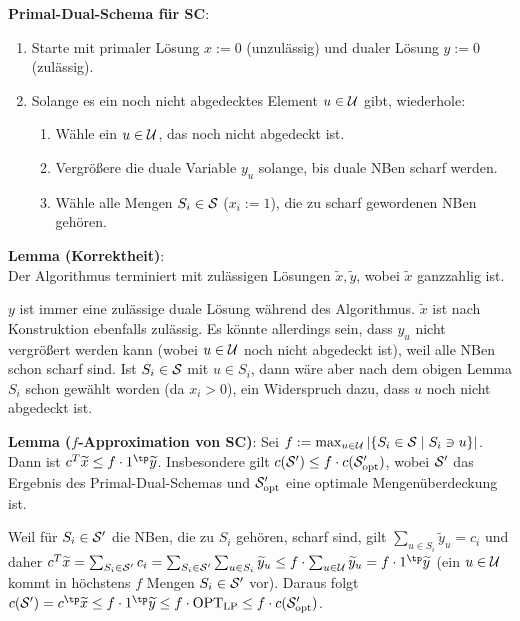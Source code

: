 \linie

\textbf{Primal-Dual-Schema für SC}:
\begin{enumerate}
    \item
    Starte mit primaler Lösung $x := 0$ (unzulässig) und
    dualer Lösung $y := 0$ (zulässig).

    \item
    Solange es ein noch nicht abgedecktes Element $u \in \U$ gibt, wiederhole:
    \begin{enumerate}
        \item
        Wähle ein $u \in \U$, das noch nicht abgedeckt ist.

        \item
        Vergrößere die duale Variable $y_u$ solange, bis duale NBen scharf werden.

        \item
        Wähle alle Mengen $S_i \in \S$ ($x_i := 1$), die zu scharf gewordenen NBen gehören.
    \end{enumerate}
\end{enumerate}

\textbf{Lemma (Korrektheit)}:\\
Der Algorithmus terminiert mit zulässigen Lösungen $\widetilde{x}, \widetilde{y}$,
wobei $\widetilde{x}$ ganzzahlig ist.

\begin{Beweis}
    $y$ ist immer eine zulässige duale Lösung während des Algorithmus.
    $\widetilde{x}$ ist nach Konstruktion ebenfalls zulässig.
    Es könnte allerdings sein, dass $y_u$ nicht vergrößert werden kann
    (wobei $u \in \U$ noch nicht abgedeckt ist), weil alle NBen schon scharf sind.
    Ist $S_i \in \S$ mit $u \in S_i$, dann wäre aber nach dem obigen Lemma
    $S_i$ schon gewählt worden (da $x_i > 0$), ein Widerspruch dazu,
    dass $u$ noch nicht abgedeckt ist.
\end{Beweis}

\linie

\textbf{Lemma ($f$-Approximation von SC)}:
Sei $f := \max_{u \in \U} |\{S_i \in \S \;|\; S_i \ni u\}|$.\\
Dann ist $c^T \widetilde{x} \le f \cdot 1^\tp \widetilde{y}$.
Insbesondere gilt
$c(\S') \le f \cdot c(\S'_\opt)$, wobei $\S'$ das Ergebnis des Primal-Dual-Schemas und
$\S'_\opt$ eine optimale Mengenüberdeckung ist.

\begin{Beweis}
    Weil für $S_i \in \S'$ die NBen, die zu $S_i$ gehören, scharf sind,
    gilt $\sum_{u \in S_i} \widetilde{y}_u = c_i$ und daher
    $c^T \widetilde{x} = \sum_{S_i \in \S'} c_i =
    \sum_{S_i \in \S'} \sum_{u \in S_i} \widetilde{y}_u
    \le f \cdot \sum_{u \in \U} \widetilde{y}_u = f \cdot 1^\tp \widetilde{y}$
    (ein $u \in \U$ kommt in höchstens $f$ Mengen $S_i \in \S'$ vor).
    Daraus folgt
    $c(\S') = c^\tp \widetilde{x} \le f \cdot 1^\tp \widetilde{y} \le f \cdot \OPTLP \le
    f \cdot c(\S'_\opt)$.
\end{Beweis}

